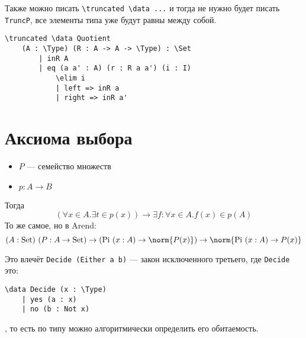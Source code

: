 Также можно писать \texttt{\textbackslash{}truncated \textbackslash{}data ...} и тогда не нужно будет писать \texttt{TruncP}, все элементы типа уже будут равны между собой.

\begin{verbatim}
\truncated \data Quotient
    (A : \Type) (R : A -> A -> \Type) : \Set
        | inR A
        | eq (a a' : A) (r : R a a') (i : I)
            \elim i
            | left => inR a
            | right => inR a'
\end{verbatim}

\section{Аксиома выбора}

\begin{itemize}
    \item \(P\) --- семейство множеств
    \item \(p : A \to B\)
\end{itemize}
Тогда
\[(\forall x \in A.\exists t \in p(x)) \to \exists f : \forall x \in A.f(x) \in p(A)\]
То же самое, но в Arend:
\[(A : \mathrm{Set})\ (P : A \to \mathrm{Set}) \to (\mathrm{Pi}\ (x : A) \to \norm{P(x)}) \to \norm{\mathrm{Pi}\ (x : A) \to P(x)}\]

Это влечёт \texttt{Decide (Either a b)} --- закон исключенного третьего, где \texttt{Decide} это:
\begin{verbatim}
\data Decide (x : \Type)
    | yes (a : x)
    | no (b : Not x)
\end{verbatim}
, то есть по типу можно алгоритмически определить его обитаемость.
